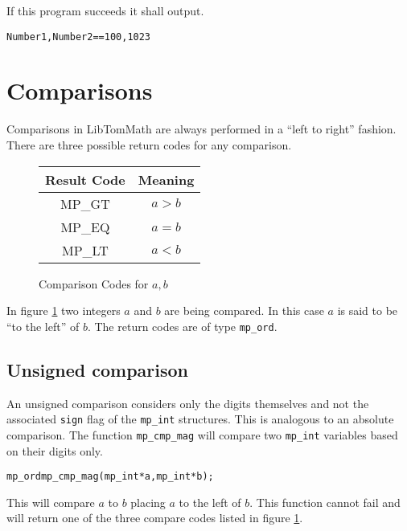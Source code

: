 \documentclass[synpaper]{book}
\begin{document}
If this program succeeds it shall output.
\begin{alltt}
Number1, Number2 == 100, 1023
\end{alltt}

\section{Comparisons}

Comparisons in LibTomMath are always performed in a ``left to right'' fashion.	There are three
possible return codes for any comparison.

  
\begin{figure}[h]
  \begin{center}
    \begin{tabular}{|c|c|}
      \hline \textbf{Result Code} & \textbf{Meaning} \\
      \hline MP\_GT               & $a > b$          \\
      \hline MP\_EQ               & $a = b$          \\
      \hline MP\_LT               & $a < b$          \\
      \hline
    \end{tabular}
  \end{center}
  \caption{Comparison Codes for $a, b$}
  \label{fig:CMP}
\end{figure}

In figure \ref{fig:CMP} two integers $a$ and $b$ are being compared.  In this case $a$ is said to
be ``to the left'' of $b$. The return codes are of type \texttt{mp\_ord}.

\subsection{Unsigned comparison}

An unsigned comparison considers only the digits themselves and not the associated \texttt{sign}
flag of the \texttt{mp\_int} structures.  This is analogous to an absolute comparison.	The
function \texttt{mp\_cmp\_mag} will compare two \texttt{mp\_int} variables based on their digits
only.

\begin{alltt}
mp_ord mp_cmp_mag(mp_int *a, mp_int *b);
\end{alltt}
This will compare $a$ to $b$ placing $a$ to the left of $b$.  This function cannot fail and will
return one of the three compare codes listed in figure \ref{fig:CMP}.
\end{document}
